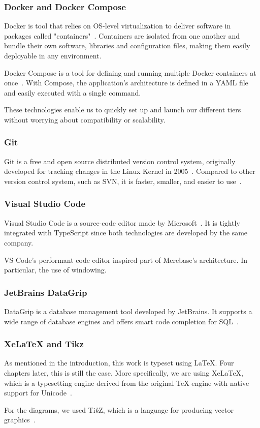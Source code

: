\subsubsection{Docker and Docker Compose}

Docker is tool that relies on OS-level virtualization to deliver software in packages called "containers"~\autocite{noauthor_container_nodate}. Containers are isolated from one another and bundle their own software, libraries and configuration files, making them easily deployable in any environment.

Docker Compose is a tool for defining and running multiple Docker containers at once~\autocite{noauthor_overview_2021}. With Compose, the application's architecture is defined in a YAML file and easily executed with a single command.

These technologies enable us to quickly set up and launch our different tiers without worrying about compatibility or scalability.

\subsubsection{Git}

Git is a free and open source distributed version control system, originally developed for tracking changes in the Linux Kernel in 2005~\autocite{noauthor_git_nodate}.
Compared to other version control system, such as SVN, it is faster, smaller, and easier to use~\autocite{noauthor_about_nodate}.

\subsubsection{Visual Studio Code}

Visual Studio Code is a source-code editor made by Microsoft~\autocite{noauthor_visual_nodate}.
It is tightly integrated with TypeScript since both technologies are developed by the same company.

VS Code's performant code editor inspired part of Merebase's architecture. In particular, the use of windowing.

\subsubsection{JetBrains DataGrip}

DataGrip is a database management tool developed by JetBrains. It supports a wide range of database engines and offers smart code completion for SQL~\autocite{noauthor_datagrip:_nodate}.

\subsubsection{XeLaTeX and Tikz}

As mentioned in the introduction, this work is typeset using \LaTeX. Four chapters later, this is still the case.
More specifically, we are using XeLaTeX, which is a typesetting engine derived from the original TeX engine with native support for Unicode~\autocite{noauthor_xelatex_nodate}.

For the diagrams, we used Ti\emph{k}Z, which is a language for producing vector graphics~\autocite{noauthor_tikz_nodate}.